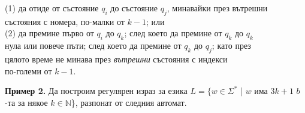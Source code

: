 \documentclass[openany]{book}
\begin{document}
            (1) да отиде от състояние $q_i$ до състояние $q_j$, минавайки през вътрешни \\
            \hspace{13pt}    състояния с номера, по-малки от $k-1$; или \\
            (2) да премине първо от $q_i$ до $q_k$; след което да премине от $q_k$ до $q_k$ \\
            \hspace{13pt}    нула или повече пъти; след което да премине от $q_k$ до $q_j$; като през \\
            \hspace{13pt}    цялото време не минава през \textit{вътрешни} състояния с индекси \\
            \hspace{13pt}    по-големи от $k-1$. 
        
            \vspace{15pt}
        
            \textbf{Пример 2.} Да построим регулярен израз за езика 
            $L = \{w \in \Sigma^*$ | $w$ има $3k + 1$ $b$-та за някое $k \in \mathbb{N}$\}, разпонат от следния автомат.
            \begin{center}
            \end{center}
        
\end{document}
